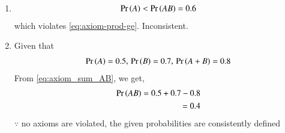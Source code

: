 \begin{enumerate}
\item 
\begin{align}
\Pr\left(A\right) < 
\Pr\left(AB\right) = 0.6
\end{align}
which violates
	\eqref{eq:axiom-prod-ge}.  Inconsistent.
\item Given that 
\begin{align}
\Pr\left(A\right) = 0.5,\,
\Pr\left(B\right) = 0.7,\,
\Pr\left(A+B\right) = 0.8
\end{align}
From \eqref{eq:axiom_sum_AB}, we get, 
\begin{align}
\pr{AB} = 0.5+ 0.7 - 0.8 \\
= 0.4 \label{eq:ncert/11/16/3/12/3}
\end{align}
$\because$ no axioms are violated, 
the given probabilities are consistently defined
\end{enumerate}


